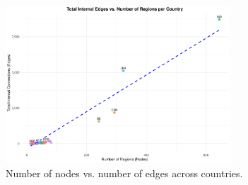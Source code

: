 \begin{figure}[htbp]
  \centering
  \includegraphics[width=0.75\textwidth]{images/edges_vs_nodes_plot.pdf}
  \caption{Number of nodes vs. number of edges across countries.}
  \label{fig:network-structure}
\end{figure}

